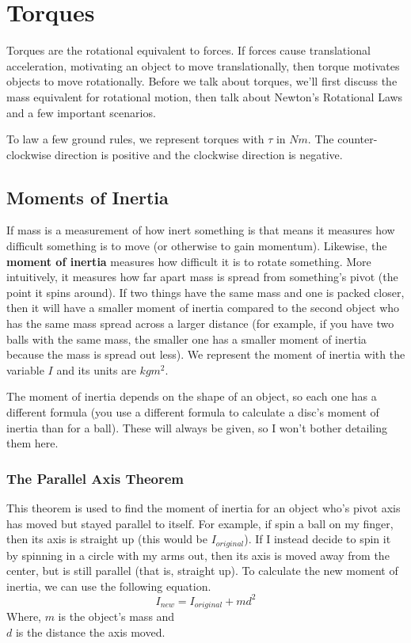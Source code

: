 \section{Torques}
Torques are the rotational equivalent to forces.
If forces cause translational acceleration, motivating an object to move translationally, then torque
motivates objects to move rotationally. Before we talk about torques, we'll first discuss the mass equivalent for rotational motion, then talk about
Newton's Rotational Laws and a few important scenarios.

To law a few ground rules, we represent torques with $\tau$ in $Nm$. The counter-clockwise direction is positive and the clockwise direction is negative.

\subsection{Moments of Inertia}
If mass is a measurement of how inert something is that means it measures how difficult something is to move (or otherwise to gain momentum). Likewise,
the \textbf{moment of inertia} measures how difficult it is to rotate something. More intuitively, it measures how far apart mass is spread from
something's pivot (the point it spins around). If two things have the same mass and one is packed closer, then it will have a smaller moment of inertia
compared to the second object who has the same mass spread across a larger distance (for example, if you have two balls with the same mass, the smaller
one has a smaller moment of inertia because the mass is spread out less). We represent the moment of inertia with the variable $I$ and its units are
$kgm^2$.

The moment of inertia depends on the shape of an object, so each one has a different formula (you use a different formula to calculate a disc's moment
of inertia than for a ball). These will always be given, so I won't bother detailing them here.

\subsubsection{The Parallel Axis Theorem}
This theorem is used to find the moment of inertia for an object who's pivot axis has moved but stayed parallel to itself. For example, if spin a ball
on my finger, then its axis is straight up (this would be $I_{original}$). If I instead decide to spin it by spinning in a circle with my arms out, then 
its axis is moved away from the center, but is still parallel (that is, straight up). To calculate the new moment of inertia, we can use the following
equation.
\begin{equation}
    I_{new} = I_{original} + md^2
\end{equation}
Where,
$m$ is the object's mass and \\
$d$ is the distance the axis moved.

